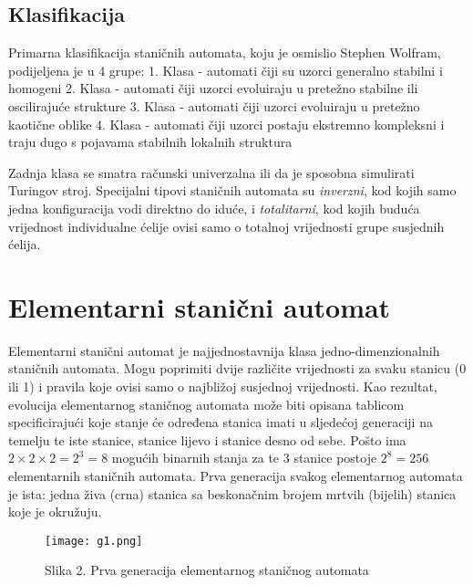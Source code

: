 \documentclass[11pt]{article}
\makeatletter
\def\maxwidth{\ifdim\Gin@nat@width>\linewidth\linewidth
    \else\Gin@nat@width\fi}
\let\Oldincludegraphics\includegraphics
\renewcommand{\includegraphics}[1]{\Oldincludegraphics[width=.8\maxwidth]{#1}}
\makeatother
\begin{document}

\subsection{Klasifikacija}\label{klasifikacija}

Primarna klasifikacija staničnih automata, koju je osmislio Stephen
Wolfram, podijeljena je u 4 grupe: 1. Klasa - automati čiji su uzorci
generalno stabilni i homogeni 2. Klasa - automati čiji uzorci evoluiraju
u pretežno stabilne ili oscilirajuće strukture 3. Klasa - automati čiji
uzorci evoluiraju u pretežno kaotične oblike 4. Klasa - automati čiji
uzorci postaju ekstremno kompleksni i traju dugo s pojavama stabilnih
lokalnih struktura

Zadnja klasa se smatra računski univerzalna ili da je sposobna
simulirati Turingov stroj. Specijalni tipovi staničnih automata su
\emph{inverzni}, kod kojih samo jedna konfiguracija vodi direktno do
iduće, i \emph{totalitarni}, kod kojih buduća vrijednost individualne
ćelije ovisi samo o totalnoj vrijednosti grupe susjednih ćelija.

    \section{Elementarni stanični
automat}\label{elementarni-staniux10dni-automat}

Elementarni stanični automat je najjednostavnija klasa
jedno-dimenzionalnih staničnih automata. Mogu poprimiti dvije različite
vrijednosti za svaku stanicu (0 ili 1) i pravila koje ovisi samo o
najbližoj susjednoj vrijednosti. Kao rezultat, evolucija elementarnog
staničnog automata može biti opisana tablicom specificirajući koje
stanje će određena stanica imati u sljedećoj generaciji na temelju te
iste stanice, stanice lijevo i stanice desno od sebe. Pošto ima
\(2 \times 2 \times 2 = 2^3 = 8\) mogućih binarnih stanja za te 3
stanice postoje \(2^8=256\) elementarnih staničnih automata. Prva
generacija svakog elementarnog automata je ista: jedna živa (crna)
stanica sa beskonačnim brojem mrtvih (bijelih) stanica koje je okružuju.

\begin{figure}[hbtp]
\centering
\texttt{[image: g1.png]}
\caption{Slika 2. Prva generacija elementarnog staničnog automata}
\end{figure}
\end{document}
